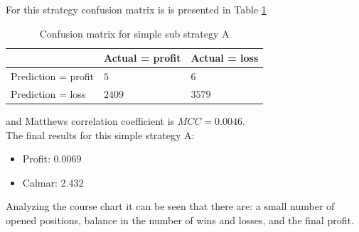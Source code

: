 \documentclass{jtacs}
\begin{document}
For this strategy confusion matrix is is presented in Table \ref{tab1}
\begin{table}[ht]
\centering
\caption{Confusion matrix for simple sub strategy A}
\label{tab1}
\begin{tabular}{|l|l|l|}\hline
&	Actual = profit	& Actual = loss\\ \hline
Prediction = profit & $5$	& $6$ \\ \hline
Prediction = loss &	$2409$ &	$3579$ \\ \hline
\end{tabular}
\end{table}
\FloatBarrier
\noindent and Matthews correlation coefficient is $MCC=0.0046$.\\
\noindent The final results for this simple strategy A:
\begin{itemize}
\item Profit: $0.0069$
\item Calmar: $2.432$
\end{itemize}
Analyzing the course chart it can be seen that there are: a small number of opened positions, balance in the number of wins and losses, and the final profit. \\
\end{document}
